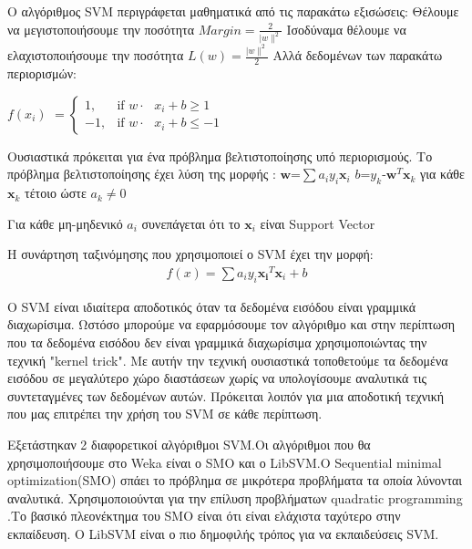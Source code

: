 Ο αλγόριθμος SVM περιγράφεται μαθηματικά από τις παρακάτω εξισώσεις:
\newline
Θέλουμε να μεγιστοποιήσουμε την ποσότητα   $ Margin=\frac{2}{|w\|^2} $
\newline
Ισοδύναμα θέλουμε να ελαχιστοποιήσουμε την ποσότητα  $ L(w)=\frac{|w\|^2}{2} $
\newline
	Αλλά δεδομένων των παρακάτω περιορισμών:


 $f(x_i)$ 
$ = \begin{cases} 1, & \mbox{if } w\cdot\mbox{ $x_i +b \geq 1 $} \\ -1, & \mbox{if } w\cdot\mbox{ $x_i +b \leq -1 $} \end{cases} $


 Ουσιαστικά πρόκειται για ένα πρόβλημα βελτιστοποίησης υπό περιορισμούς.
 Το πρόβλημα βελτιστοποίησης έχει λύση της μορφής :
\newline $\boldsymbol  w $=$\sum a_i y_i \boldsymbol x_i $ $b$=$y_k$-$\boldsymbol w^T \boldsymbol x_k$ για κάθε $\boldsymbol x_k$ τέτοιο ώστε $a_k\not= 0$
 
 Για κάθε μη-μηδενικό $a_i$ συνεπάγεται ότι το $\boldsymbol x_i$ είναι Support Vector
 
 Η συνάρτηση ταξινόμησης που χρησιμοποιεί ο SVM έχει την μορφή:
\begin{align*} 
f(x)=\sum a_i y_i \boldsymbol {x_i}^T \boldsymbol x_i +b
\end{align*}

Ο SVM είναι ιδιαίτερα αποδοτικός όταν τα δεδομένα εισόδου είναι γραμμικά διαχωρίσιμα. Ωστόσο μπορούμε να
 εφαρμόσουμε τον αλγόριθμο και στην περίπτωση που τα δεδομένα εισόδου δεν είναι γραμμικά διαχωρίσιμα
 χρησιμοποιώντας την τεχνική "kernel trick". Με αυτήν την τεχνική ουσιαστικά τοποθετούμε τα δεδομένα εισόδου σε μεγαλύτερο χώρο διαστάσεων χωρίς να υπολογίσουμε αναλυτικά τις συντεταγμένες των δεδομένων αυτών. Πρόκειται λοιπόν για μια αποδοτική τεχνική που μας επιτρέπει την χρήση του SVM σε κάθε περίπτωση.

Εξετάστηκαν 2 διαφορετικοί αλγόριθμοι SVM.Οι αλγόριθμοι που θα χρησιμοποιήσουμε στο Weka είναι ο SMO και ο LibSVM.O Sequential minimal optimization(SMO) σπάει το πρόβλημα σε μικρότερα προβλήματα τα οποία λύνονται αναλυτικά. Χρησιμοποιούνται για την επίλυση προβλήματων quadratic programming .Το βασικό πλεονέκτημα του SMO είναι ότι είναι ελάχιστα ταχύτερο στην εκπαίδευση. O LibSVM είναι ο πιο δημοφιλής τρόπος για να εκπαιδεύσεις SVM.


 
